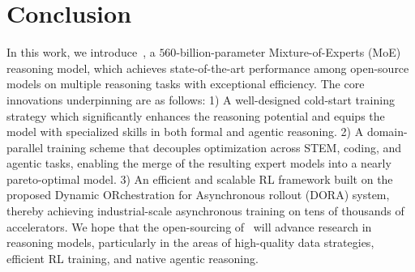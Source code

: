 \section{Conclusion}

In this work, we introduce~{\longcatthink}, a $560$-billion-parameter Mixture-of-Experts (MoE) reasoning model, which achieves state-of-the-art performance among open-source models on multiple reasoning tasks with exceptional efficiency. 
The core innovations underpinning {\longcatthink} are as follows:
1) A well-designed cold-start training strategy which significantly enhances the reasoning potential and equips the model with specialized skills in both formal and agentic reasoning.
2) A domain-parallel training scheme that decouples optimization across STEM, coding, and agentic tasks, enabling the merge of the resulting expert models into a nearly pareto-optimal model.
3) An efficient and scalable RL framework built on the proposed Dynamic ORchestration for Asynchronous rollout (DORA) system, thereby achieving industrial-scale asynchronous training on tens of thousands of accelerators.
We hope that the open-sourcing of~{\longcatthink} will advance research in reasoning models, particularly in the areas of high-quality data strategies, efficient RL training, and native agentic reasoning.




